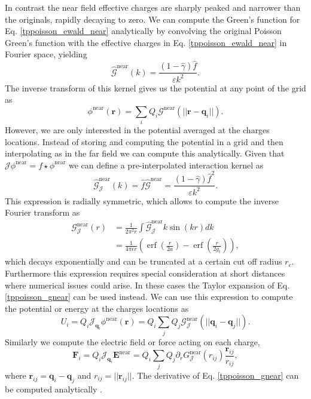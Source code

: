 \documentclass[ twoside,openright,titlepage,numbers=noenddot,%
headinclude,footinclude,cleardoublepage=empty,abstract=on,
BCOR=5mm,paper=b5,fontsize=11pt, dvipsnames
]{scrreprt}
\renewcommand{\vec}[1]{\bm{#1}}
\newcommand{\oper}[1]{\mathcal{#1}}
\newcommand{\near}{\textrm{near}}
\DeclareMathOperator{\erf}{erf}
\newcommand{\ppos}{q}
\newcommand{\fpos}{r}
\begin{document}
In contrast the near field effective charges are sharply peaked and narrower than the originals, rapidly decaying to zero. We can compute the Green's function for Eq. \eqref{tppoisson_ewald_near} analytically by convolving the original Poisson Green's function with the effective charges in Eq. \eqref{tppoisson_ewald_near} in Fourier space, yielding
\begin{equation}
  \hat{\oper{G}}^{\near}(k) = \frac{(1-\hat{\gamma})\hat{f}}{\varepsilon k^2}.
\end{equation}
The inverse transform of this kernel gives us the potential at any point of the grid as
\begin{equation}
  \phi^{\near}(\vec{\fpos}) = \sum_i{Q_i\oper{G}^{\near}(||\vec{\fpos}-\vec{\ppos}_i||)}.
\end{equation}
However, we are only interested in the potential averaged at the charges locations. Instead of storing and computing the potential in a grid and then interpolating as in the far field we can compute this analytically. Given that $\oper{J} \phi^{\near} = f\star \phi^{\near}$ we can define a pre-interpolated interaction kernel as
\begin{equation}
  \hat{\oper{G}}_{\oper{J}}^{\near}(k) = \hat{f}\hat{\oper{G}}^{\near} = \frac{(1-\hat{\gamma})\hat{f}^2}{\varepsilon k^2}.
\end{equation}
This expression is radially symmetric, which allows to compute the inverse Fourier transform as
\begin{equation}
  \label{tppoisson_gnear}
  \begin{aligned}
    \oper{G}_{\oper{J}}^{\near}(r) &= \frac{1}{2\pi^2r}\int{\hat{\oper{G}}^{\near}_{\oper{J}}k \sin(kr)dk} \\
            &= \frac{1}{4\pi\epsilon r}\left(\erf\left(\frac{r}{2a}\right) - \erf\left(\frac{r}{2g_t}\right)\right),
  \end{aligned}
\end{equation}
which decays exponentially and can be truncated at a certain cut off radius $r_c$. Furthermore this expression requires special consideration at short distances where numerical issues could arise. In these cases the Taylor expansion of Eq. \eqref{tppoisson_gnear} can be used instead.
We can use this expression to compute the potential or energy at the charges locations as
\begin{equation}
  U_i = Q_i\oper{J}_{\vec{\ppos}_i}\phi^{\near}(\vec{\fpos}) = Q_i\sum_j{Q_j\oper{G}_{\oper{J}}^{\near}(||\vec{\ppos}_i - \vec{\ppos}_j||)}.
\end{equation}
Similarly we compute the electric field or force acting on each charge,
\begin{equation}
  \vec{F}_i = Q_i \oper{J}_{\vec{\ppos}_i} \vec{E}^{\near} = Q_i\sum_j{Q_j\partial_r G_{\oper{J}}^{\near}({r_{ij}})\frac{\vec{r}_{ij}}{r_{ij}}},
\end{equation}
where $\vec{r}_{ij} = \vec{\ppos}_i - \vec{\ppos}_j$ and $r_{ij} = ||\vec{r}_{ij}||$. The derivative of Eq. \eqref{tppoisson_gnear} can be computed analytically \cite{Maxian2021}.
\end{document}
